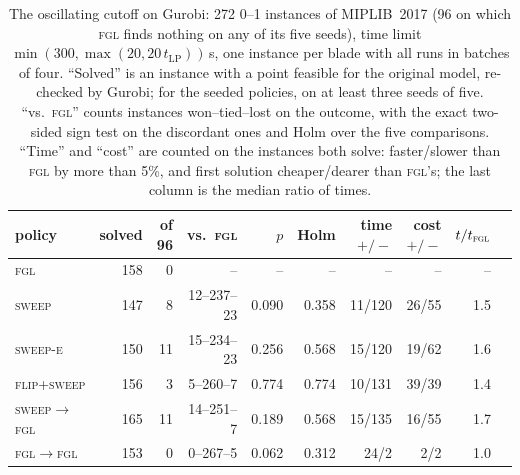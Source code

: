 \begin{table}[t]
\centering\small
\caption{The oscillating cutoff on Gurobi: 272 0--1 instances of MIPLIB~2017 (96 on which \textsc{fgl} finds nothing on any of its five seeds), time limit $\min(300,\max(20,20\,t_{\mathrm{LP}}))$\,s, one instance per blade with all runs in batches of four. ``Solved'' is an instance with a point feasible for the original model, re-checked by Gurobi; for the seeded policies, on at least three seeds of five. ``vs.\ \textsc{fgl}'' counts instances won--tied--lost on the outcome, with the exact two-sided sign test on the discordant ones and Holm over the five comparisons. ``Time'' and ``cost'' are counted on the instances both solve: faster/slower than \textsc{fgl} by more than 5\%, and first solution cheaper/dearer than \textsc{fgl}'s; the last column is the median ratio of times.}
\label{tab:react}
\begin{tabular}{lrrrrrrrrr}
\toprule
policy & solved & of 96 & vs.\ \textsc{fgl} & $p$ & Holm & time $+/-$ & cost $+/-$ & $t/t_{\textsc{fgl}}$ \\
\midrule
\textsc{fgl} & 158 & 0 & -- & -- & -- & -- & -- & -- \\
\textsc{sweep} & 147 & 8 & 12--237--23 & 0.090 & 0.358 & 11/120 & 26/55 & 1.5 \\
\textsc{sweep-e} & 150 & 11 & 15--234--23 & 0.256 & 0.568 & 15/120 & 19/62 & 1.6 \\
\textsc{flip+sweep} & 156 & 3 & 5--260--7 & 0.774 & 0.774 & 10/131 & 39/39 & 1.4 \\
\textsc{sweep$\to$fgl} & 165 & 11 & 14--251--7 & 0.189 & 0.568 & 15/135 & 16/55 & 1.7 \\
\textsc{fgl$\to$fgl} & 153 & 0 & 0--267--5 & 0.062 & 0.312 & 24/2 & 2/2 & 1.0 \\
\bottomrule
\end{tabular}
\end{table}
